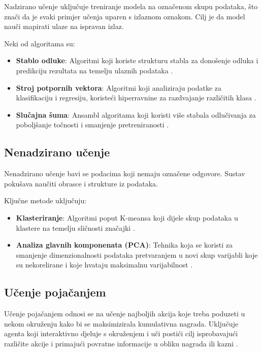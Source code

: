 \documentclass[zavrsnirad,upload]{fer}
\begin{document}
Nadzirano učenje uključuje treniranje modela na označenom skupu podataka, što znači da je svaki primjer učenja uparen s izlaznom oznakom. Cilj je da model nauči mapirati ulaze na ispravan izlaz.

Neki od algoritama su:

\begin{itemize}
	\item \textbf{Stablo odluke}: Algoritmi koji koriste strukturu stabla za donošenje odluka i predikciju rezultata na temelju ulaznih podataka \cite{somvanshi2016}.
	\item \textbf{Stroj potpornih vektora}: Algoritmi koji analiziraju podatke za klasifikaciju i regresiju, koristeći hiperravnine za razdvajanje različitih klasa \cite{somvanshi2016}.
	\item \textbf{Slučajna šuma}: Ansambl algoritama koji koristi više stabala odlučivanja za poboljšanje točnosti i smanjenje pretreniranosti \cite{mahesh2019}.
\end{itemize}

\subsection{Nenadzirano učenje}

Nenadzirano učenje bavi se podacima koji nemaju označene odgovore. Sustav pokušava naučiti obrasce i strukture iz podataka.

Ključne metode uključuju:

\begin{itemize}
	\item \textbf{Klasteriranje}: Algoritmi poput K-meansa koji dijele skup podataka u klastere na temelju sličnosti značajki \cite{somvanshi2016}.
	\item \textbf{Analiza glavnih komponenata (PCA)}: Tehnika koja se koristi za smanjenje dimenzionalnosti podataka pretvaranjem u novi skup varijabli koje su nekorelirane i koje hvataju maksimalnu varijabilnost \cite{somvanshi2016}.
\end{itemize}

\subsection{Učenje pojačanjem}

Učenje pojačanjem odnosi se na učenje najboljih akcija koje treba poduzeti u nekom okruženju kako bi se maksimizirala kumulativna nagrada. Uključuje agenta koji interaktivno djeluje s okruženjem i uči postići cilj isprobavajući različite akcije i primajući povratne informacije u obliku nagrada ili kazni \cite{mahesh2019}.
\end{document}
